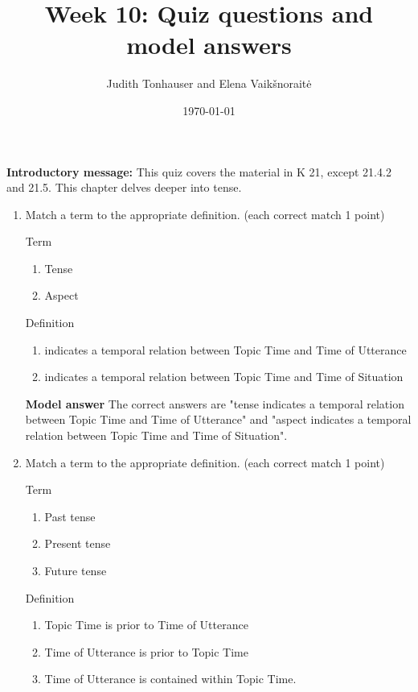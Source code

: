 \documentclass[a4,11pt]{article}
\title{Week 10: Quiz questions and model answers}
\author{Judith Tonhauser and Elena Vaik\v snorait\.{e} }
\date{\today}
\newcommand{\6}{\mbox{$[\hspace*{-.6mm}[$}}
\newcommand{\9}{\mbox{$]\hspace*{-.6mm}]$}}
\begin{document}
\maketitle

{\bf Introductory message:} This quiz covers the material in K 21, except 21.4.2 and 21.5. This chapter delves deeper into tense. 

\begin{enumerate}[leftmargin = 12pt]

\item Match a term to the appropriate definition. (each correct match 1 point)

Term
\begin{enumerate}[noitemsep]
\item Tense
\item Aspect
\end{enumerate}

Definition

\begin{enumerate}[noitemsep]
\item indicates a temporal relation between Topic Time and Time of Utterance
\item indicates a temporal relation between Topic Time and Time of Situation
\end{enumerate}

{\bf Model answer} The correct answers are "tense indicates a temporal relation between Topic Time and Time of Utterance" and "aspect indicates a temporal relation between Topic Time and Time of Situation".

\item Match a term to the appropriate definition. (each correct match 1 point)

Term

\begin{enumerate}[noitemsep]
\item Past tense 
\item Present tense 
\item Future tense
\end{enumerate}

Definition

\begin{enumerate}[noitemsep]
\item Topic Time is prior to Time of Utterance
\item Time of Utterance is prior to Topic Time 
\item Time of Utterance  is contained within Topic Time.
\end{enumerate}



\end{enumerate}
\end{document}
